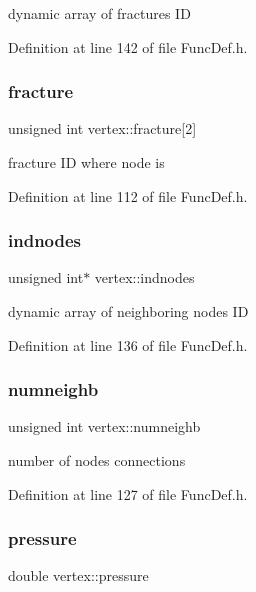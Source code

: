 dynamic array of fractures ID 

Definition at line 142 of file Func\+Def.\+h.

\mbox{\label{structvertex_aa2cd06573422bc415cb8f38a67232de7}} 
\subsubsection{\texorpdfstring{fracture}{fracture}}
{\footnotesize\ttfamily unsigned int vertex\+::fracture\mbox{[}2\mbox{]}}

fracture ID where node is 

Definition at line 112 of file Func\+Def.\+h.

\mbox{\label{structvertex_a82e41673a29352ee0f004ae7890d5266}} 
\subsubsection{\texorpdfstring{indnodes}{indnodes}}
{\footnotesize\ttfamily unsigned int$\ast$ vertex\+::indnodes}

dynamic array of neighboring nodes ID 

Definition at line 136 of file Func\+Def.\+h.

\mbox{\label{structvertex_acf83b561551952403148f73fe032f57b}} 
\subsubsection{\texorpdfstring{numneighb}{numneighb}}
{\footnotesize\ttfamily unsigned int vertex\+::numneighb}

number of nodes connections 

Definition at line 127 of file Func\+Def.\+h.

\mbox{\label{structvertex_a54ac97be271319fa385aef0685ea0641}} 
\subsubsection{\texorpdfstring{pressure}{pressure}}
{\footnotesize\ttfamily double vertex\+::pressure}

